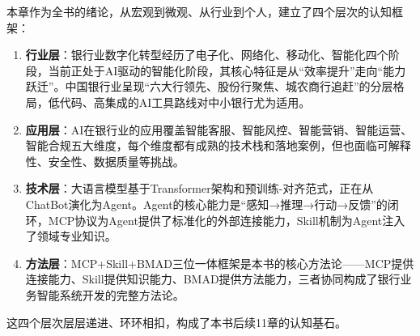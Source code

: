 本章作为全书的绪论，从宏观到微观、从行业到个人，建立了四个层次的认知框架：

\begin{enumerate}[leftmargin=2em]
  \item \textbf{行业层}：银行业数字化转型经历了电子化、网络化、移动化、智能化四个阶段，当前正处于AI驱动的智能化阶段，其核心特征是从``效率提升''走向``能力跃迁''。中国银行业呈现``六大行领先、股份行聚焦、城农商行追赶''的分层格局，低代码、高集成的AI工具路线对中小银行尤为适用。
  \item \textbf{应用层}：AI在银行业的应用覆盖智能客服、智能风控、智能营销、智能运营、智能合规五大维度，每个维度都有成熟的技术栈和落地案例，但也面临可解释性、安全性、数据质量等挑战。
  \item \textbf{技术层}：大语言模型基于Transformer架构和预训练-对齐范式，正在从ChatBot演化为Agent。Agent的核心能力是``感知→推理→行动→反馈''的闭环，MCP协议为Agent提供了标准化的外部连接能力，Skill机制为Agent注入了领域专业知识。
  \item \textbf{方法层}：MCP+Skill+BMAD三位一体框架是本书的核心方法论——MCP提供连接能力、Skill提供知识能力、BMAD提供方法能力，三者协同构成了银行业务智能系统开发的完整方法论。
\end{enumerate}

这四个层次层层递进、环环相扣，构成了本书后续11章的认知基石。




